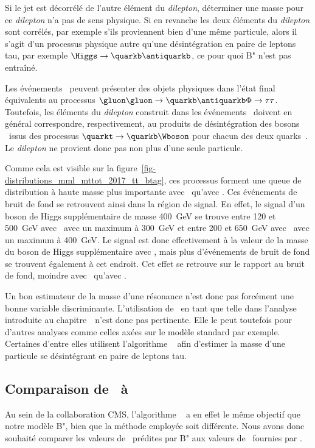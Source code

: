 Si le jet est décorrélé de l'autre élément du \emph{dilepton},
déterminer une masse pour ce \emph{dilepton} n'a pas de sens physique.
Si en revanche les deux éléments du \emph{dilepton} sont corrélés,
par exemple s'ils proviennent bien d'une même particule,
alors il s'agit d'un processus physique autre qu'une désintégration en paire de leptons tau,
par exemple $\Higgs\to\quarkb\antiquarkb$,
ce pour quoi B" n'est pas entraîné.
\par
Les événements \ttbar\ peuvent présenter des objets physiques dans l'état final équivalents
au processus $\gluon\gluon\to\quarkb\antiquarkb\Phi\to\tau\tau$.
Toutefois, les éléments du \emph{dilepton} construit dans les événements \ttbar\
doivent en général correspondre, respectivement, au produits de désintégration des bosons \Wboson\ issus des processus
$\quarkt\to\quarkb\Wboson$ pour chacun des deux quarks~\quarkt.
Le \emph{dilepton} ne provient donc pas non plus d'une seule particule.
\par
Comme cela est visible sur la figure~\ref{fig-distributions_mml_mttot_2017_tt_btag},
ces processus forment une queue de distribution à haute masse plus importante avec \mml\ qu'avec \mTtot.
Ces événements de bruit de fond se retrouvent ainsi dans la région de signal.
En effet, le signal d'un boson de Higgs supplémentaire de masse \SI{400}{\GeV} se trouve
entre \num{120} et \SI{500}{\GeV} avec \mTtot\
avec un maximum à \SI{300}{\GeV}
et
entre \num{200} et \SI{650}{\GeV} avec \mml\
avec un maximum à \SI{400}{\GeV}.
Le signal est donc effectivement à la valeur de la masse du boson de Higgs supplémentaire avec \mml,
mais plus d'événements de bruit de fond se trouvent également à cet endroit.
Cet effet se retrouve sur le rapport au bruit de fond, moindre avec \mml\ qu'avec \mTtot.
\par
Un bon estimateur de la masse d'une résonance n'est donc pas forcément une bonne variable discriminante.
L'utilisation de \mml\ en tant que telle dans l'analyse introduite au chapitre~\refChHTT\ n'est donc pas pertinente.
Elle le peut toutefois pour d'autres analyses comme celles axées sur le modèle standard par exemple.
Certaines d'entre elles utilisent l'algorithme \SVFIT~\cite{SVFit_Bianchini_2014} afin d'estimer
la masse d'une particule se désintégrant en paire de leptons tau.
\subsection{Comparaison de \mml\ à \msv}
Au sein de la collaboration CMS, l'algorithme \SVFIT~\cite{SVFit_Bianchini_2014} a en effet le même objectif que notre modèle B",
bien que la méthode employée soit différente.
Nous avons donc souhaité comparer
les valeurs de \mml\ prédites par B"
aux valeurs de \msv\ fournies par \SVFIT.
